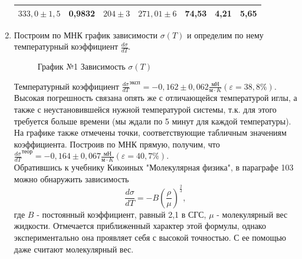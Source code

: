 \documentclass[a4paper]{article}
\begin{document}
\begin{enumerate}
\begin{table}[h!]
\begin{center}
\begin{tabular}{|*{7}{c|}}
			$333,0\pm 1,5$   & 0,9832   &	$204\pm 3$&	$271,01\pm6$&	74,53&	4,21&	5,65\\ \hline
		\end{tabular}
	\end{center}
\end{table}
\item Построим по МНК график зависимости $\sigma(T)$ и определим по нему температурный коэффициент $\frac{d\sigma}{dT}$.
\clearpage
\begin{figure}[h!]
\caption[]{\label{} График №1 Зависимость $\sigma (T)$}
\end{figure}

Температурный коэффициент $\frac{d\sigma}{dT}^{\text{эксп}} = -0,162 \pm 0,062 \frac{\text{мН}}{\text{м} \cdot K}(\varepsilon = 38,8\%)$. Высокая погрешность связана опять же с отличающейся температурой иглы, а также с неустановившейся нужной температурой системы, т.к. для этого требуется больше времени (мы ждали по 5 минут для каждой температуры). На графике также отмечены точки, соответствующие табличным значениям коэффициента. Построив по МНК прямую, получим, что $\frac{d\sigma}{dT}^{\text{теор}} = -0,164 \pm 0,067 \frac{\text{мН}}{\text{м} \cdot K}(\varepsilon = 40,7\%)$.\\
Обратившись к учебнику Кикоиных "Молекулярная физика", в параграфе 103 можно обнаружить зависимость
\begin{equation*}
	\frac{d\sigma}{dT} = -B(\frac{\rho}{\mu})^{\frac{2}{3}},
\end{equation*}
где $B$ - постоянный коэффициент, равный 2,1 в СГС, $\mu$ - молекулярный вес жидкости. Отмечается приближенный характер этой формулы, однако экспериментально она проявляет себя с высокой точностью. С ее помощью даже считают молекулярный вес.\newline


\end{enumerate}
\end{document}
